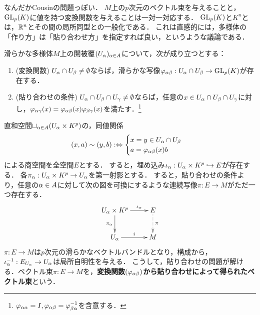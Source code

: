 \documentclass[uplatex,dvipdfmx]{jsreport}
\begin{document}
\begin{tcolorbox}[colframe=ForestGreen, colback=ForestGreen!10!white,breakable,colbacktitle=ForestGreen!40!white,coltitle=black,fonttitle=\bfseries\sffamily,
title=]
    なんだかCousinの問題っぽい．
    $M$上の$p$次元のベクトル束を与えることと，$\mathrm{GL}_p(K)$に値を持つ変換関数を与えることは一対一対応する．
    $\mathrm{GL}_p(K)$と$K^n$とは，$\mathbb{R}^n$とその間の局所同型との一般化である．
    これは直感的には，多様体の「作り方」は「貼り合わせ方」を指定すれば良い，というような議論である．
\end{tcolorbox}

\begin{problem}
    滑らかな多様体$M$上の開被覆$(U_\alpha)_{\alpha\in A}$について，次が成り立つとする：
    \begin{enumerate}
        \item (変換関数) $U_\alpha\cap U_\beta\ne\emptyset$ならば，滑らかな写像$\varphi_{\alpha\beta}:U_\alpha\cap U_\beta\to\mathrm{GL}_p(K)$が存在する．
        \item (貼り合わせの条件) $U_\alpha\cap U_\beta\cap U_\gamma\ne\emptyset$ならば，任意の$x\in U_\alpha\cap U_\beta\cap U_\gamma$に対し，$\varphi_{\alpha\gamma}(x)=\varphi_{\alpha\beta}(x)\varphi_{\beta\gamma}(x)$を満たす．\footnote{$\varphi_{\alpha\alpha}=I,\varphi_{\alpha\beta}=\varphi_{\beta\alpha}^{-1}$を含意する．}
    \end{enumerate}
\end{problem}

\begin{definition}[貼り合わせによる構成]
    直和空間$\sqcup_{\alpha\in A}(U_\alpha\times K^p)$の，同値関係
    \[(x,a)\sim (y,b):\Leftrightarrow\begin{cases}
    x=y\in U_\alpha\cap U_\beta\\
    a=\varphi_{\alpha\beta}(x)b
    \end{cases}\]
    による商空間を全空間$E$とする．
    すると，埋め込み$\iota_\alpha:U_\alpha\times K^p\hookrightarrow E$が存在する．
    各$\pi_\alpha:U_\alpha\times K^p\to U_\alpha$を第一射影とする．
    すると，貼り合わせの条件より，任意の$\alpha\in A$に対して次の図を可換にするような連続写像$\pi:E\to M$がただ一つ存在する．
    \[\xymatrix{
        U_\al\times K^p\ar[r]^-{\iota_\al}\ar[d]_-{\pi_\al}&E\ar@{.>}[d]^-\pi\\
        U_\al\ar[r]^-i&M
    }\]
    $\pi:E\to M$は$p$次元の滑らかなベクトルバンドルとなり，構成から，$\iota_\alpha^{-1}:E_{U_\alpha}\to U_\alpha$は局所自明性を与える．
    こうして，貼り合わせの問題が解ける．ベクトル束$\pi:E\to M$を，\textbf{変換関数$(\varphi_{\alpha\beta})$から貼り合わせによって得られたベクトル束}という．
\end{definition}
\end{document}
